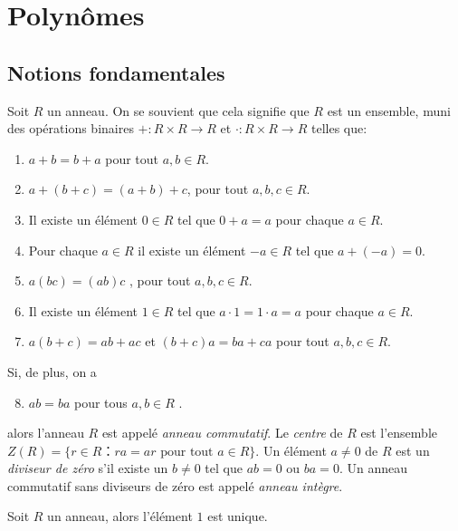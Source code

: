 \chapter{Polynômes}
\label{cha:polynomes}

\section{Notions fondamentales}
\label{sec:noti-fond}


Soit $R$ un anneau. On se souvient que cela signifie que  $R$ est un ensemble,  muni des opérations binaires  $+ : R × R → R$  et $⋅: R × R → R$ telles que: 
\begin{enumerate}[(R1)]
\item $a+ b  = b+a$ pour tout     $a,b ∈ R$. \label{R1}
\item $a + (b+c) = (a + b) +c$, pour tout $a ,b,c ∈ R$. \label{R2}
\item Il existe un élément $0 ∈R$ tel que $0+a =a$ pour chaque $a ∈R$. \label{R3}
\item Pour chaque $a ∈R$ il existe un élément $-a ∈R$ tel que $a + (-a) = 0$. \label{R4}
\item $a(bc) = (ab) c$ , pour tout $a,b,c ∈ R$. \label{R5}
\item Il existe un élément $1 ∈R$ tel que $a ⋅ 1 = 1 ⋅a = a$ pour chaque $a ∈R$. \label{R6}
\item $a (b+c) = ab + ac$ et $(b+c) a =ba +ca$  pour tout $a,b,c ∈R$.\label{R7} 
\end{enumerate}
Si, de plus, on a 
\begin{enumerate}[(R1)]
  \setcounter{enumi}{7}
\item  $a b = ba$ pour tous $a,b ∈R$ \label{R8}. 
\end{enumerate}
alors l'anneau $R$ est appelé \emph{anneau commutatif}. Le \emph{centre} de $R$ est l'ensemble $Z(R) = \{ r ∈ R ： ra = ar \text{ pour tout } a ∈ R\}$. 
Un élément  $a ≠0$ de $R$ est un \emph{diviseur de zéro} s'il existe un $b≠0$ tel que $ab = 0$ ou $ba = 0$. Un anneau commutatif sans diviseurs de zéro est appelé \emph{anneau intègre}.  



\begin{exercise}
  Soit $R$ un anneau, alors l'élément $1$ est unique. 
\end{exercise}



